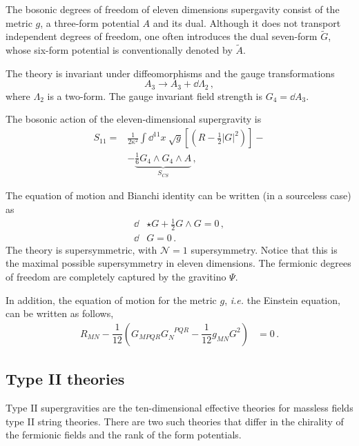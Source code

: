 \documentclass[debug]{phd}
\begin{document}
				The bosonic degrees of freedom of eleven dimensions supergavity consist of the metric $g$, a three-form potential $A$ and its dual.
				Although it does not transport independent degrees of freedom, one often introduces the dual seven-form $\tilde G$, whose six-form potential is conventionally denoted by $\tilde A$.			
	
				The theory is invariant under diffeomorphisms and the gauge transformations			
					 	\begin{equation}
							A_3 \longrightarrow A_3 + \dd \Lambda_2 \, ,
						\end{equation}
				where $\Lambda_2$ is a two-form. 
				The gauge invariant field strength is $G_4 = \dd A_3$.
				
				The bosonic action of the eleven-dimensional supergravity is
						\begin{equation}
							\begin{split}
								S_{11} =& \frac{1}{2\kappa^2} \int \dd^{11} x \ \sqrt{g} \left[ \left(R - \frac{1}{2} \lvert G \rvert^2 \right)\right] - \\
								& - \underbrace{\frac{1}{6} G_4 \wedge G_4 \wedge A}_{S_{CS}} \, , 
							\end{split}
						\end{equation}
				
The equation of motion and Bianchi identity can be written (in a sourceless case) as
						\begin{equation}
							\begin{split}
								\dd &\star G + \frac{1}{2} G \wedge G = 0 \, , \\
								\dd &G = 0 \, .
							\end{split}
						\end{equation}
The theory is supersymmetric, with $\mathcal{N}=1$ supersymmetry. Notice that this is the maximal possible supersymmetry in eleven dimensions.
The fermionic degrees of freedom are completely captured by the gravitino $\Psi$. 
				
				
				In addition, the equation of motion for the metric $g$, \emph{i.e.} the Einstein equation, can be written as follows,
						\begin{align}
							R_{MN} - \dfrac{1}{12}\left( G_{MPQR}G_{N}^{\phantom{N}PQR} - \dfrac{1}{12}g_{MN} G^2 \right) &= 0 \, .
						\end{align}
			\subsection{Type II theories}\label{sec:IIsugra}
Type II supergravities are the ten-dimensional effective theories for massless fields type II string theories. There are two such theories that differ in the chirality of
the fermionic fields and the rank of the form potentials. 
\end{document}
